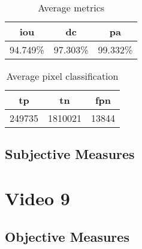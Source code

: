\begin{minipage}[c]{0.475\textwidth}
\begin{table}[H]
    \centering
    \begin{tabular}{||c c c||} 
        \hline
        \acrshort{iou} & \acrshort{dc} & \acrshort{pa} \\ [0.5ex] 
        \hline\hline
        94.749\% & 97.303\% & 99.332\% \\ [1ex] 
        \hline
    \end{tabular}
    \caption{Average metrics}
    \label{tab:metrics_video_8}
\end{table}
\end{minipage}
\begin{minipage}[c]{0.475\textwidth}
\begin{table}[H]
    \centering
    \begin{tabular}{||c c c||} 
        \hline
        \acrshort{tp} & \acrshort{tn} & \acrshort{fpn} \\ [0.5ex] 
        \hline\hline
        249735 & 1810021 & 13844 \\ [1ex] 
        \hline
    \end{tabular}
    \caption{Average pixel classification}
    \label{tab:pixels_video_8}
\end{table}
\end{minipage}

\subsection{Subjective Measures}


\section{Video 9}
\subsection{Objective Measures}

